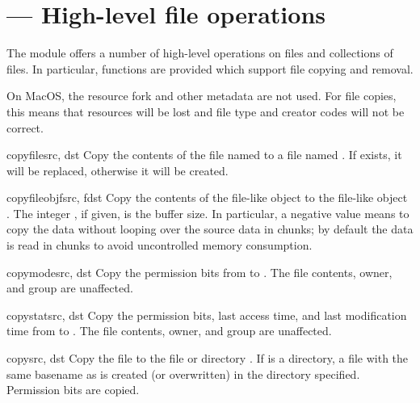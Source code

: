 \section{ ---
         High-level file operations}



The  module offers a number of high-level operations on
files and collections of files.  In particular, functions are provided 
which support file copying and removal.

  On MacOS, the resource fork and other metadata are
not used.  For file copies, this means that resources will be lost and 
file type and creator codes will not be correct.


\begin{funcdesc}{copyfile}{src, dst}
  Copy the contents of the file named  to a file named
  .  If  exists, it will be replaced, otherwise it
  will be created.
\end{funcdesc}

\begin{funcdesc}{copyfileobj}{fsrc, fdst}
  Copy the contents of the file-like object  to the
  file-like object .  The integer , if given,
  is the buffer size. In particular, a negative  value
  means to copy the data without looping over the source data in
  chunks; by default the data is read in chunks to avoid uncontrolled
  memory consumption.
\end{funcdesc}

\begin{funcdesc}{copymode}{src, dst}
  Copy the permission bits from  to .  The file
  contents, owner, and group are unaffected.
\end{funcdesc}

\begin{funcdesc}{copystat}{src, dst}
  Copy the permission bits, last access time, and last modification
  time from  to .  The file contents, owner, and
  group are unaffected.
\end{funcdesc}

\begin{funcdesc}{copy}{src, dst}
  Copy the file  to the file or directory .  If
   is a directory, a file with the same basename as  
  is created (or overwritten) in the directory specified.  Permission
  bits are copied.
\end{funcdesc}

